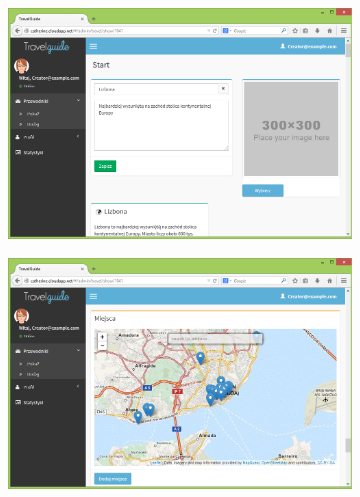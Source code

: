 \documentclass[a4paper]{book}
\begin{document}
		\begin{figure}[H]
			\ContinuedFloat
			
			\begin{subfigure}{1\textwidth}
				\includegraphics[width=\textwidth]{screenshots/web/7edycja.png}					
				\caption{\label{subfig:web_edit}}
			\end{subfigure}
			\hfill
			\begin{subfigure}{1\textwidth}
				\includegraphics[width=\textwidth]{screenshots/web/8edycja2.png}	
				\caption{\label{subfig:web_edit2}}
			\end{subfigure}
			
		\end{figure}
\end{document}
